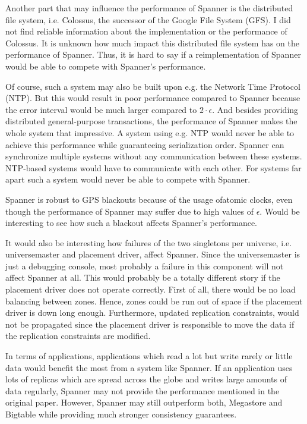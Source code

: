 \documentclass[onecolumn, a4paper, 10pt]{article}
\begin{document}
Another part that may influence the performance of Spanner is the distributed
file system, i.e. Colossus, the successor of the Google File System (GFS). I did
not find reliable information about the implementation or the performance of
Colossus. It is unknown how much impact this distributed file system has on the
performance of Spanner. Thus, it is hard to say if a reimplementation of Spanner
would be able to compete with Spanner's performance.

Of course, such a system may also be built upon e.g. the Network Time Protocol
(NTP). But this would result in poor performance compared to Spanner because the
error interval would be much larger compared to $2\cdot\epsilon$. And besides
providing distributed general-purpose transactions, the performance of Spanner
makes the whole system that impressive. A system using e.g. NTP would never be
able to achieve this performance while guaranteeing serialization order. Spanner
can synchronize multiple systems without any communication between these systems.
NTP-based systems would have to communicate with each other. For systems far apart
such a system would never be able to compete with Spanner.

Spanner is robust to GPS blackouts because of the usage ofatomic clocks, even
though the performance of Spanner may suffer due to high values of $\epsilon$.
Would be interesting to see how such a blackout affects Spanner's performance.

It would also be interesting how failures of the two singletons per universe,
i.e. universemaster and placement driver, affect Spanner. Since the universemaster
is just a debugging console, most probably a failure in this component will not
affect Spanner at all. This would probably be a totally different story if the
placement driver does not operate correctly. First of all, there would be no
load balancing between zones. Hence, zones could be run out of space if the
placement driver is down long enough. Furthermore, updated replication
constraints, would not be propagated since the placement driver is responsible
to move the data if the replication constraints are modified.

In terms of applications, applications which read a lot but write rarely or little
data would benefit the most from a system like Spanner. If an application uses
lots of replicas which are spread across the globe and writes large amounts of data
regularly, Spanner may not provide the performance mentioned in the original
paper. However, Spanner may still outperform both, Megastore and Bigtable while
providing much stronger consistency guarantees.



\end{document}

